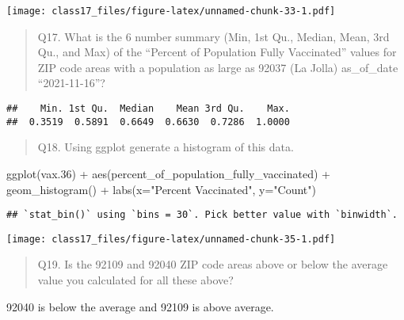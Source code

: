 \documentclass[
]{article}
\newenvironment{Shaded}{\begin{snugshade}}{\end{snugshade}}
\newcommand{\AttributeTok}[1]{\textcolor[rgb]{0.77,0.63,0.00}{#1}}
\newcommand{\FloatTok}[1]{\textcolor[rgb]{0.00,0.00,0.81}{#1}}
\newcommand{\FunctionTok}[1]{\textcolor[rgb]{0.00,0.00,0.00}{#1}}
\newcommand{\NormalTok}[1]{#1}
\newcommand{\SpecialCharTok}[1]{\textcolor[rgb]{0.00,0.00,0.00}{#1}}
\newcommand{\StringTok}[1]{\textcolor[rgb]{0.31,0.60,0.02}{#1}}
\begin{document}
\texttt{[image: class17\_files/figure-latex/unnamed-chunk-33-1.pdf]}

\begin{quote}
Q17. What is the 6 number summary (Min, 1st Qu., Median, Mean, 3rd Qu.,
and Max) of the ``Percent of Population Fully Vaccinated'' values for
ZIP code areas with a population as large as 92037 (La Jolla)
as\_of\_date ``2021-11-16''?
\end{quote}

\begin{Shaded}
\end{Shaded}

\begin{verbatim}
##    Min. 1st Qu.  Median    Mean 3rd Qu.    Max. 
##  0.3519  0.5891  0.6649  0.6630  0.7286  1.0000
\end{verbatim}

\begin{quote}
Q18. Using ggplot generate a histogram of this data.
\end{quote}

\begin{Shaded}
\begin{Highlighting}[]
\FunctionTok{ggplot}\NormalTok{(vax}\FloatTok{.36}\NormalTok{) }\SpecialCharTok{+}
  \FunctionTok{aes}\NormalTok{(percent\_of\_population\_fully\_vaccinated) }\SpecialCharTok{+}
  \FunctionTok{geom\_histogram}\NormalTok{() }\SpecialCharTok{+}
  \FunctionTok{labs}\NormalTok{(}\AttributeTok{x=}\StringTok{"Percent Vaccinated"}\NormalTok{, }\AttributeTok{y=}\StringTok{"Count"}\NormalTok{)}
\end{Highlighting}
\end{Shaded}

\begin{verbatim}
## `stat_bin()` using `bins = 30`. Pick better value with `binwidth`.
\end{verbatim}

\texttt{[image: class17\_files/figure-latex/unnamed-chunk-35-1.pdf]}

\begin{quote}
Q19. Is the 92109 and 92040 ZIP code areas above or below the average
value you calculated for all these above?
\end{quote}

92040 is below the average and 92109 is above average.
\end{document}
